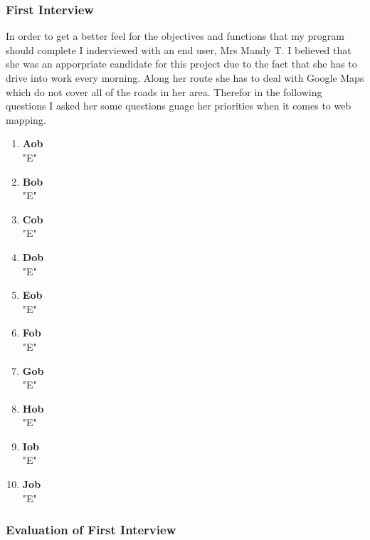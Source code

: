 \begin{flushleft}
            \subsubsection{First Interview}
            \large
            In order to get a better feel for the objectives and functions that my program should complete I inderviewed with an end user, Mrs Mandy T. I believed that she was an apporpriate candidate for this
            project due to the fact that she has to drive into work every morning. Along her route she has to deal with Google Maps which do not cover all of the roads in her area. Therefor in the following questions
            I asked her some questions guage her priorities when it comes to web mapping.
            \bk
            \begin{enumerate}
                \item {\bf{Aob}} \\
                \bk
                "E"
                \item {\bf{Bob}} \\
                \bk
                "E"
                \item {\bf{Cob}} \\
                \bk
                "E"
                \item {\bf{Dob}} \\
                \bk
                "E"
                \item {\bf{Eob}} \\
                \bk
                "E"
                \item {\bf{Fob}} \\
                \bk
                "E"
                \item {\bf{Gob}} \\
                \bk
                "E"
                \item {\bf{Hob}} \\
                \bk
                "E"
                \item {\bf{Iob}} \\
                \bk
                "E"
                \item {\bf{Job}} \\
                \bk
                "E"
            \end{enumerate}
            
            \subsubsection{Evaluation of First Interview}
            \lipsum[2]


\end{flushleft}
